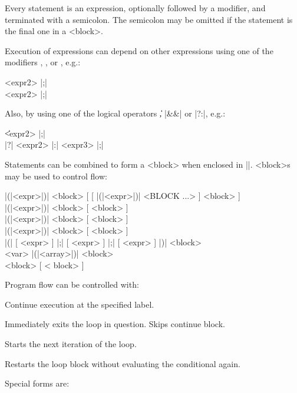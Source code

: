Every statement is an expression, optionally followed by a modifier,
and terminated with a semicolon.  The semicolon may be omitted if the
statement is the final one in a <block>.

Execution of expressions can depend on other expressions using one of
the modifiers , ,  or ,
e.g.:

  <expr2> |;| \\
\quad	<expr1>  <expr2> |;|

Also, by using one of the logical operators \|\|, |&&| or |?:|, e.g.:

 \|\| <expr2> |;| \\
\quad	<expr1> |?| <expr2> |:| <expr3> |;| 

Statements can be combined to form a <block> when enclosed in |{}|.
<block>s may be used to control flow:

\quad	{} |(|<expr>|)| <block> [ [ 
	|(|<expr>|)| <BLOCK ...> ] 
	<block> ]
\\
\quad	{} |(|<expr>|)| <block> [ 
	<block> ]
\\
  |(|<expr>|)|
	<block> [  <block> ]
\\
  |(|<expr>|)|
	<block> [  <block> ]
\\
  |(| [ <expr> ] |;|
	[ <expr> ] |;| [ <expr> ] |)| <block>
\\
  <var>\dag
	|(|<array>|)| <block>
\\
 <block> [  < block> ]

Program flow can be controlled with:

\begin{enum}{1cm}

Continue execution at the specified label.

Immediately exits the loop in question. Skips continue block.

Starts the next iteration of the loop.

Restarts the loop block without evaluating the conditional again.

\end{enum}

Special forms are:


